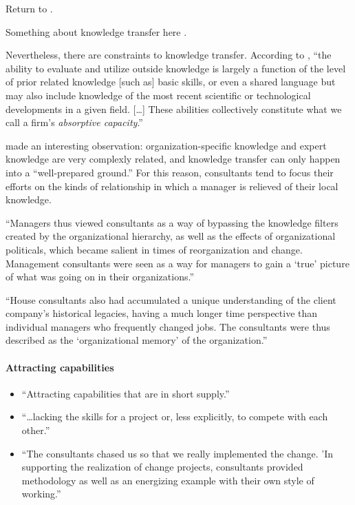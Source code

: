\documentclass[12pt]{article}
\providecommand{\tightlist}{%
  \setlength{\itemsep}{0pt}\setlength{\parskip}{0pt}}
\begin{document}
Return to \citet{turner1982}.

Something about knowledge transfer here \citep{sturdy2009}.

Nevertheless, there are constraints to knowledge transfer. According to
\citet[128-129]{cohen1990}, ``the ability to evaluate and utilize
outside knowledge is largely a function of the level of prior related
knowledge {[}such as{]} basic skills, or even a shared language but may
also include knowledge of the most recent scientific or technological
developments in a given field. {[}\ldots{]} These abilities collectively
constitute what we call a firm's \emph{absorptive capacity}.''

\citet[84]{fincham2002} made an interesting observation:
organization-specific knowledge and expert knowledge are very complexly
related, and knowledge transfer can only happen into a ``well-prepared
ground.'' For this reason, consultants tend to focus their efforts on
the kinds of relationship in which a manager is relieved of their local
knowledge.

``Managers thus viewed consultants as a way of bypassing the knowledge
filters created by the organizational hierarchy, as well as the effects
of organizational politicals, which became salient in times of
reorganization and change. Management consultants were seen as a way for
managers to gain a `true' picture of what was going on in their
organizations.'' \citep[ 54]{werr2002}

``House consultants also had accumulated a unique understanding of the
client company's historical legacies, having a much longer time
perspective than individual managers who frequently changed jobs. The
consultants were thus described as the `organizational memory' of the
organization.''

\hypertarget{attracting-capabilities}{%
\paragraph{Attracting capabilities}\label{attracting-capabilities}}

\begin{itemize}
\tightlist
\item
  ``Attracting capabilities that are in short supply.''
  \citet[52]{aubert1996}
\item
  ``\ldots lacking the skills for a project or, less explicitly, to
  compete with each other.'' \citep[ 233]{sturdy1998}
\item
  ``The consultants chased us so that we really implemented the change.
  'In supporting the realization of change projects, consultants
  provided methodology as well as an energizing example with their own
  style of working.'' \citep[ 54]{werr2002}
\end{itemize}
\end{document}
